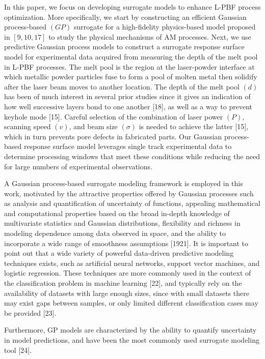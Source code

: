 \documentclass[10pt]{article}
\begin{document}
In this paper, we focus on developing surrogate models to enhance L-PBF process optimization. More specifically, we start by constructing an efficient Gaussian process-based $(G P)$ surrogate for a high-fidelity physics-based model proposed in $[9,10,17]$ to study the physical mechanisms of AM processes. Next, we use predictive Gaussian process models to construct a surrogate response surface model for experimental data acquired from measuring the depth of the melt pool in L-PBF processes. The melt pool is the region at the laser-powder interface at which metallic powder particles fuse to form a pool of molten metal then solidify after the laser beam moves to another location. The depth of the melt pool $(d)$ has been of much interest in several prior studies since it gives an indication of how well successive layers bond to one another [18], as well as a way to prevent keyhole mode [15]. Careful selection of the combination of laser power $(P)$, scanning speed $(v)$, and beam size $(\sigma)$ is needed to achieve the latter [15], which in turn prevents pore defects in fabricated parts. Our Gaussian process-based response surface model leverages single track experimental data to determine processing windows that meet these conditions while reducing the need for large numbers of experimental observations.

A Gaussian process-based surrogate modeling framework is employed in this work, motivated by the attractive properties offered by Gaussian processes such as analysis and quantification of uncertainty of functions, appealing mathematical and computational properties based on the broad in-depth knowledge of multivariate statistics and Gaussian distributions, flexibility and richness in modeling dependence among data observed in space, and the ability to incorporate a wide range of smoothness assumptions [1921]. It is important to point out that a wide variety of powerful data-driven predictive modeling techniques exists, such as artificial neural networks, support vector machines, and logistic regression. These techniques are more commonly used in the context of the classification problem in machine learning [22], and typically rely on the availability of datasets with large enough sizes, since with small datasets there may exist gaps between samples, or only limited different classification cases may be provided [23].

Furthermore, GP models are characterized by the ability to quantify uncertainty in model predictions, and have been the most commonly used surrogate modeling tool [24].
\end{document}
